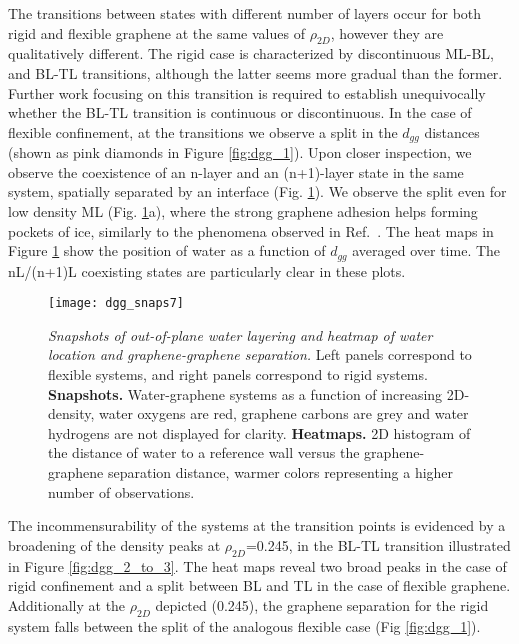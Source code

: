 \documentclass[journal=acsnano,manuscript=article]{achemso}
\begin{document}
	The transitions between states with different number of layers occur for both rigid and flexible graphene at the same values of \(\rho_{2D}\), however they are qualitatively different. The rigid case is characterized by discontinuous ML-BL, and BL-TL transitions, although the latter seems more gradual than the former. Further work focusing on this transition is required to establish unequivocally whether the BL-TL transition is continuous or discontinuous. In the case of flexible confinement, at the transitions we observe a split in the \(d_{gg}\) distances (shown as pink diamonds in Figure \ref{fig:dgg_1}). Upon closer inspection, we observe the coexistence of an n-layer and an (n+1)-layer state in the same system, spatially separated by an interface (Fig. \ref{fig:dgg_2}). We observe the split even for low density ML (Fig. \ref{fig:dgg_2}a), where the strong graphene adhesion helps forming pockets of ice, similarly to the phenomena observed in Ref.~. The heat maps in Figure \ref{fig:dgg_2} show the position of water as a function of \(d_{gg}\) averaged over time. The nL/(n+1)L coexisting states are particularly clear in these plots.  
	
	\begin{figure}[ht!]
		\centering
		\texttt{[image: dgg\_snaps7]}
		\caption{\textit{Snapshots of out-of-plane water layering and heatmap of water location and graphene-graphene separation.} Left panels correspond to flexible systems, and right panels correspond to rigid systems. \textbf{Snapshots.} Water-graphene systems as a function of increasing 2D-density, water oxygens are red, graphene carbons are grey and water hydrogens are not displayed for clarity. \textbf{Heatmaps.} 2D histogram of the distance of water to a reference wall versus the graphene-graphene separation distance, warmer colors representing a higher number of observations.}
		\label{fig:dgg_2}
	\end{figure}
	
	The incommensurability of the systems at the transition points is evidenced by a broadening of the density peaks at \(\rho_{2D}\)=0.245, in the BL-TL transition illustrated in Figure \ref{fig:dgg_2_to_3}. The heat maps reveal two broad peaks in the case of rigid confinement and a split between BL and TL in the case of flexible graphene. Additionally at the \(\rho_{2D}\) depicted (0.245), the graphene separation for the rigid system falls between the split of the analogous flexible case (Fig \ref{fig:dgg_1}).
	
\end{document}
